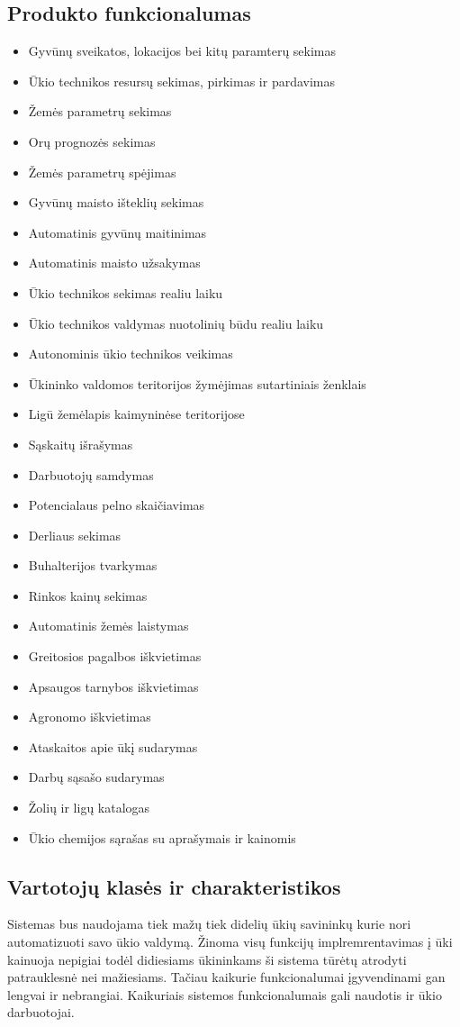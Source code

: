 \documentclass[oneside]{VUMIFPSkursinis}
\begin{document}
\subsection{Produkto funkcionalumas}
\begin{itemize}
	\item Gyvūnų sveikatos, lokacijos bei kitų paramterų sekimas
	\item Ūkio technikos resursų sekimas, pirkimas ir pardavimas
	\item Žemės parametrų sekimas
	\item Orų prognozės sekimas
	\item Žemės parametrų spėjimas
	\item Gyvūnų maisto išteklių sekimas
	\item Automatinis gyvūnų maitinimas
	\item Automatinis maisto užsakymas
	\item Ūkio technikos sekimas realiu laiku
	\item Ūkio technikos valdymas nuotolinių būdu realiu laiku
	\item Autonominis ūkio technikos veikimas
	\item Ūkininko valdomos teritorijos žymėjimas sutartiniais ženklais
	\item Ligū žemėlapis kaimyninėse teritorijose
	\item Sąskaitų išrašymas
	\item Darbuotojų samdymas
	\item Potencialaus pelno skaičiavimas
	\item Derliaus sekimas
	\item Buhalterijos tvarkymas
	\item Rinkos kainų sekimas
	\item Automatinis žemės laistymas
	\item Greitosios pagalbos iškvietimas
	\item Apsaugos tarnybos iškvietimas
	\item Agronomo iškvietimas
	\item Ataskaitos apie ūkį sudarymas
	\item Darbų sąsašo sudarymas
	\item Žolių ir ligų katalogas
	\item Ūkio chemijos sąrašas su aprašymais ir kainomis
\end{itemize}
\subsection{Vartotojų klasės ir charakteristikos}
Sistemas bus naudojama tiek mažų tiek didelių ūkių savininkų kurie nori automatizuoti savo ūkio valdymą. Žinoma visų funkcijų implremrentavimas į ūki kainuoja nepigiai todėl didiesiams ūkininkams ši sistema tūrėtų atrodyti patrauklesnė nei mažiesiams. Tačiau kaikurie funkcionalumai įgyvendinami gan lengvai ir nebrangiai. Kaikuriais sistemos funkcionalumais gali naudotis ir ūkio darbuotojai.
\end{document}

